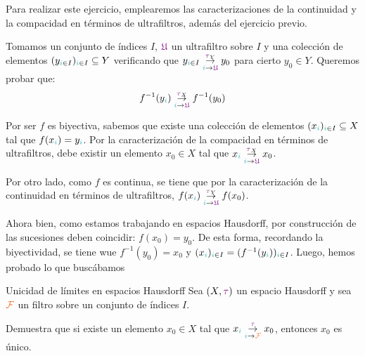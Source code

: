 \documentclass[titlepage,11pt,a4paper]{book}
\newcommand{\filt}{\ensuremath{\textcolor{Orange}{\mathcal{F}}}}
\newcommand{\ultf}{\ensuremath{\textcolor{Plum}{\mathfrak{U}}}}
\newcommand{\ii}{\ensuremath{\textcolor{TealBlue}{i}}}
\newcommand{\taut}{\textcolor{Fuchsia}{\tau}}
\begin{document}
    \begin{resol}
        Para realizar este ejercicio, emplearemos las caracterizaciones de la continuidad y la compacidad en términos de ultrafiltros, además del ejercicio previo.

        \medskip
        Tomamos un conjunto de índices $I$, $\ultf$ un ultrafiltro sobre $I$ y una colección de elementos $(y_{\ii \in I})_{\ii \in I} \subseteq Y$ verificando que $y_{\ii \in I} \underset{\ii \to \ultf}{\overset{\taut_{Y}}{\to}} y_{0}$ para cierto $y_0 \in Y$. Queremos probar que:
        \[
        f^{-1}(y_{\ii}) \underset{\ii \to \ultf}{\overset{\taut_{X}}{\to}} f^{-1}(y_{0})
        \]

        \medskip
        Por ser $f$ es biyectiva, sabemos que existe una colección de elementos  $(x_{\ii})_{\ii \in I} \subseteq X$ tal que $f(x_{\ii}) = y_{\ii}$. Por la caracterización de la compacidad en términos de ultrafiltros, debe existir un elemento $x_0 \in X$ tal que $x_{\ii} \underset{\ii \to \ultf}{\overset{\taut_{X}}{\to}} x_{0}$.

        \smallskip
        Por otro lado, como $f$ es continua, se tiene que por la caracterización de la continuidad en términos de ultrafiltros, $f(x_{\ii}) \underset{\ii \to \ultf}{\overset{\taut_{Y}}{\to}} f(x_{0})$.

        \smallskip
        Ahora bien, como estamos trabajando en espacios Hausdorff, por construcción de las sucesiones deben coincidir: $f(x_0) = y_0$. De esta forma, recordando la biyectividad, se tiene wue $f^{-1}(y_0) = x_0$ y $(x_{\ii})_{\ii \in I} = (f^{-1}(y_{\ii}))_{\ii \in I}$. Luego, hemos probado lo que buscábamos
    \end{resol}

    \begin{ejer*}{Unicidad de límites en espacios Hausdorff}
        Sea $(X, \taut)$ un espacio Hausdorff y sea $\filt$ un filtro sobre un conjunto de índices $I$.
        
        \smallskip
        Demuestra que si existe un elemento $x_0 \in X$ tal que $x_{\ii} \underset{\ii \to \filt}{\overset{\taut}{\to}} x_{0}$, entonces $x_0$ es único.
    \end{ejer*}
\end{document}
